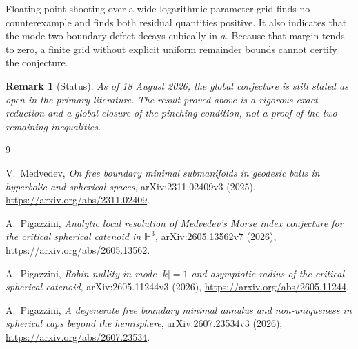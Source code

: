 \documentclass[11pt]{article}
\newtheorem{remark}[theorem]{Remark}
\begin{document}
Floating-point shooting over a wide logarithmic parameter grid finds
no counterexample and finds both residual quantities positive.  It
also indicates that the mode-two boundary defect decays cubically in
$a$.  Because that margin tends to zero, a finite grid without explicit
uniform remainder bounds cannot certify the conjecture.

\begin{remark}[Status]
As of 18 August 2026, the global conjecture is still stated as open in
the primary literature.  The result proved above is a rigorous exact
reduction and a global closure of the pinching condition, not a proof
of the two remaining inequalities.
\end{remark}

\begin{thebibliography}{9}

V.~Medvedev,
\emph{On free boundary minimal submanifolds in geodesic balls in
hyperbolic and spherical spaces},
arXiv:2311.02409v3 (2025),
\url{https://arxiv.org/abs/2311.02409}.

A.~Pigazzini,
\emph{Analytic local resolution of Medvedev's Morse index conjecture
for the critical spherical catenoid in $\mathbb H^3$},
arXiv:2605.13562v7 (2026),
\url{https://arxiv.org/abs/2605.13562}.

A.~Pigazzini,
\emph{Robin nullity in mode $|k|=1$ and asymptotic radius of the
critical spherical catenoid},
arXiv:2605.11244v3 (2026),
\url{https://arxiv.org/abs/2605.11244}.

A.~Pigazzini,
\emph{A degenerate free boundary minimal annulus and non-uniqueness
in spherical caps beyond the hemisphere},
arXiv:2607.23534v3 (2026),
\url{https://arxiv.org/abs/2607.23534}.

\end{thebibliography}
\end{document}
